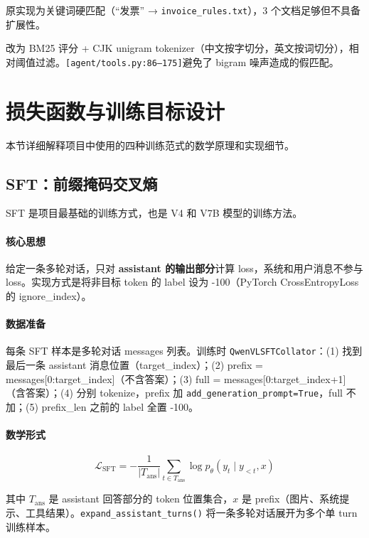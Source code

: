 \documentclass[12pt,a4paper]{ctexart}
\begin{document}
原实现为关键词硬匹配（``发票'' → \texttt{invoice\_rules.txt}），3 个文档足够但不具备扩展性。

改为 BM25 评分 + CJK unigram tokenizer（中文按字切分，英文按词切分），相对阈值过滤。\texttt{[agent/tools.py:86--175]}避免了 bigram 噪声造成的假匹配。

\section{损失函数与训练目标设计}

本节详细解释项目中使用的四种训练范式的数学原理和实现细节。

\subsection{SFT：前缀掩码交叉熵}

SFT 是项目最基础的训练方式，也是 V4 和 V7B 模型的训练方法。

\paragraph{核心思想} 给定一条多轮对话，只对 \textbf{assistant 的输出部分}计算 loss，系统和用户消息不参与 loss。实现方式是将非目标 token 的 label 设为 -100（PyTorch CrossEntropyLoss 的 ignore\_index）。

\paragraph{数据准备} 每条 SFT 样本是多轮对话 messages 列表。训练时 \texttt{QwenVLSFTCollator}：(1) 找到最后一条 assistant 消息位置（target\_index）；(2) prefix = messages[0:target\_index]（不含答案）；(3) full = messages[0:target\_index+1]（含答案）；(4) 分别 tokenize，prefix 加 \texttt{add\_generation\_prompt=True}，full 不加；(5) prefix\_len 之前的 label 全置 -100。

\paragraph{数学形式}
$$\mathcal{L}_{\text{SFT}} = -\frac{1}{|T_{\text{ans}}|}\sum_{t \in T_{\text{ans}}} \log p_\theta(y_t \mid y_{<t}, x)$$

其中 $T_{\text{ans}}$ 是 assistant 回答部分的 token 位置集合，$x$ 是 prefix（图片、系统提示、工具结果）。\texttt{expand\_assistant\_turns()} 将一条多轮对话展开为多个单 turn 训练样本。
\end{document}
